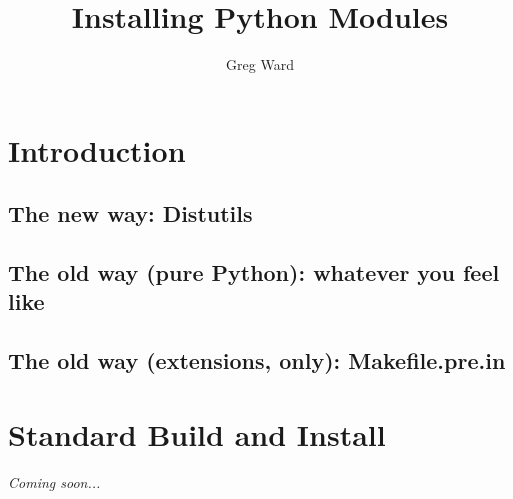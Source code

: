 \documentclass{howto}
\title{Installing Python Modules}
\author{Greg Ward}
\newcommand{\option}[1]{\textsf{\small{#1}}}
\newcommand{\filevar}[1]{{\textsl{\filenq{#1}}}}
\newcommand{\comingsoon}{\emph{Coming soon...}}
\begin{document}
\maketitle


\tableofcontents

\section{Introduction}
\label{sec:intro}

\subsection{The new way: Distutils}
\label{sec:new-way}


\subsection{The old way (pure Python): whatever you feel like}
\label{sec:old-way-pure}


\subsection{The old way (extensions, \UNIX{} only): Makefile.pre.in}
\label{sec:old-way-ext}





\section{Standard Build and Install}
\label{sec:normal-install}


\comingsoon



\newcommand{\installscheme}[8]
  {\begin{tableiii}{lll}{textrm}
          {Type of file}
          {Installation Directory}
          {Override option}
     \lineiii{pure module distribution}
             {\filevar{#1}\filenq{#2}}
             {\option{install-purelib}}
     \lineiii{non-pure module distribution}
             {\filevar{#3}\filenq{#4}}
             {\option{install-platlib}}
     \lineiii{scripts}
             {\filevar{#5}\filenq{#6}}
             {\option{install-scripts}}
     \lineiii{data}
             {\filevar{#7}\filenq{#8}}
             {\option{install-data}}
   \end{tableiii}}
\end{document}

